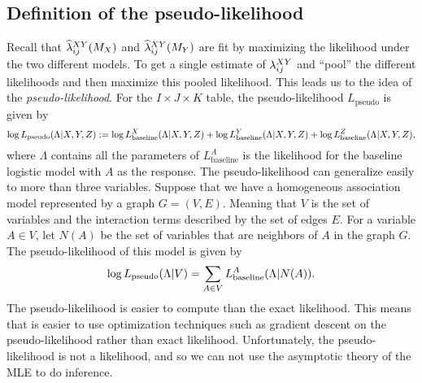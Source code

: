 \subsection{Definition of the pseudo-likelihood}
Recall that $\widehat{\lambda}^{XY}_{ij}(M_X)$ and $\widehat{\lambda}^{XY}_{ij}(M_Y)$ are fit by maximizing the likelihood under the two different models. To get a single estimate of $\lambda^{XY}_{ij}$ and ``pool'' the different likelihoods and then maximize this pooled likelihood. This leads us to the idea of the \emph{pseudo-likelihood}. For the $I\times J \times K$ table, the pseudo-likelihood $L_{\text{pseudo}}$ is given by
\[\log L_{\text{pseudo}}(\Lambda|X,Y,Z) := \log L^X_{\text{baseline}}(\Lambda|X,Y,Z) + \log L^Y_{\text{baseline}}(\Lambda|X,Y,Z) + \log L^Z_{\text{baseline}}(\Lambda|X,Y,Z), \]
where $\Lambda$ contains all the parameters of $L^A_{\text{baseline}}$ is the likelihood for the baseline logistic model with $A$ as the response. The pseudo-likelihood can generalize easily to more than three variables. Suppose that we have a homogeneous association model represented by a graph $G=(V,E)$. Meaning that $V$ is the set of variables and the interaction terms described by the set of edges $E$. For a variable $A \in V$, let $N(A)$ be the set of variables that are neighbors of $A$ in the graph $G$. The pseudo-likelihood of this model is given by 
\[ \log L_{\text{pseudo}}(\Lambda|V) = \sum_{A \in V} L^A_{\text{baseline}}(\Lambda |N(A)).\]
The pseudo-likelihood is easier to compute than the exact likelihood. This means that is easier to use optimization techniques such as gradient descent on the pseudo-likelihood rather than exact likelihood. Unfortunately, the pseudo-likelihood is not a likelihood, and so we can not use the asymptotic theory of the MLE to do inference. 

